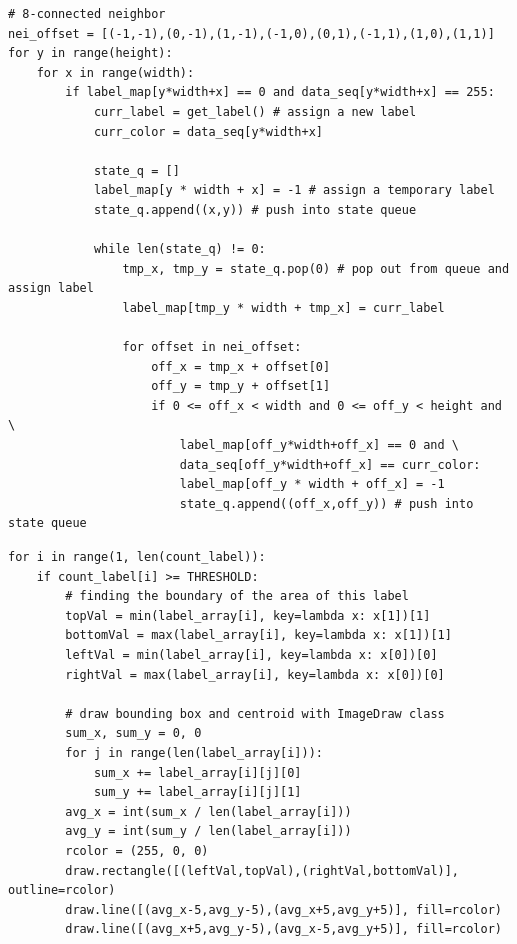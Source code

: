 \documentclass[12pt,twoside,a4paper]{article}
\begin{document}
\begin{lstlisting}[caption=Finding connected components]
# 8-connected neighbor
nei_offset = [(-1,-1),(0,-1),(1,-1),(-1,0),(0,1),(-1,1),(1,0),(1,1)]
for y in range(height):
    for x in range(width):
        if label_map[y*width+x] == 0 and data_seq[y*width+x] == 255:
            curr_label = get_label() # assign a new label
            curr_color = data_seq[y*width+x]

            state_q = []
            label_map[y * width + x] = -1 # assign a temporary label
            state_q.append((x,y)) # push into state queue

            while len(state_q) != 0:
                tmp_x, tmp_y = state_q.pop(0) # pop out from queue and assign label
                label_map[tmp_y * width + tmp_x] = curr_label

                for offset in nei_offset:
                    off_x = tmp_x + offset[0]
                    off_y = tmp_y + offset[1]
                    if 0 <= off_x < width and 0 <= off_y < height and \
                    	label_map[off_y*width+off_x] == 0 and \
                    	data_seq[off_y*width+off_x] == curr_color:
                        label_map[off_y * width + off_x] = -1
                        state_q.append((off_x,off_y)) # push into state queue
\end{lstlisting}

\begin{lstlisting}[caption=Drawing the bounding box]
for i in range(1, len(count_label)):
    if count_label[i] >= THRESHOLD:
        # finding the boundary of the area of this label
        topVal = min(label_array[i], key=lambda x: x[1])[1]
        bottomVal = max(label_array[i], key=lambda x: x[1])[1]
        leftVal = min(label_array[i], key=lambda x: x[0])[0]
        rightVal = max(label_array[i], key=lambda x: x[0])[0]
        
        # draw bounding box and centroid with ImageDraw class
        sum_x, sum_y = 0, 0
        for j in range(len(label_array[i])):
            sum_x += label_array[i][j][0]
            sum_y += label_array[i][j][1]
        avg_x = int(sum_x / len(label_array[i]))
        avg_y = int(sum_y / len(label_array[i]))
        rcolor = (255, 0, 0)
        draw.rectangle([(leftVal,topVal),(rightVal,bottomVal)], outline=rcolor)
        draw.line([(avg_x-5,avg_y-5),(avg_x+5,avg_y+5)], fill=rcolor)
        draw.line([(avg_x+5,avg_y-5),(avg_x-5,avg_y+5)], fill=rcolor)
\end{lstlisting}
\end{document}

